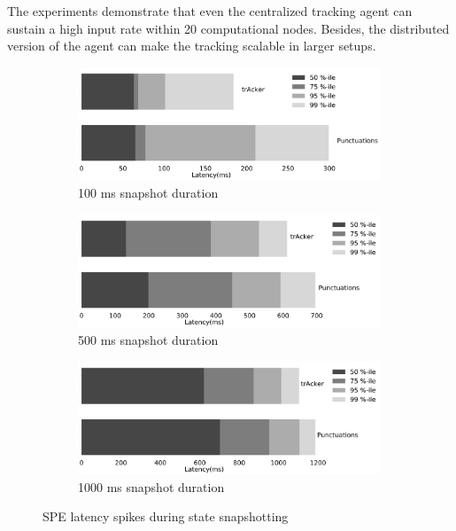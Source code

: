 The experiments demonstrate that even the centralized tracking agent can sustain a high input rate within 20 computational nodes. Besides, the distributed version of the agent can make the tracking scalable in larger setups.

\begin{figure}[t!]
    \begin{subfigure}[b]{0.3\textwidth}
            \includegraphics[width=0.99\textwidth]{pics/buffering_latencies_barh_100.png}
            \caption{100 ms snapshot duration}
            \label{100ms_snapshot}
    \end{subfigure}
    \hspace{5mm}
    \begin{subfigure}[b]{0.3\textwidth}
            \includegraphics[width=0.99\textwidth]{pics/buffering_latencies_barh_500.png}
            \caption{500 ms snapshot duration}
            \label{500ms_snapshot}
    \end{subfigure}
    \hspace{5mm}
    \begin{subfigure}[b]{0.3\textwidth}
            \includegraphics[width=0.99\textwidth]{pics/buffering_latencies_barh_1000.png}
            \caption{1000 ms snapshot duration}
            \label{1000ms_snapshot}
    \end{subfigure}
    \caption{SPE latency spikes during state snapshotting}
    \label{snapshot_spikes}
\end{figure}

